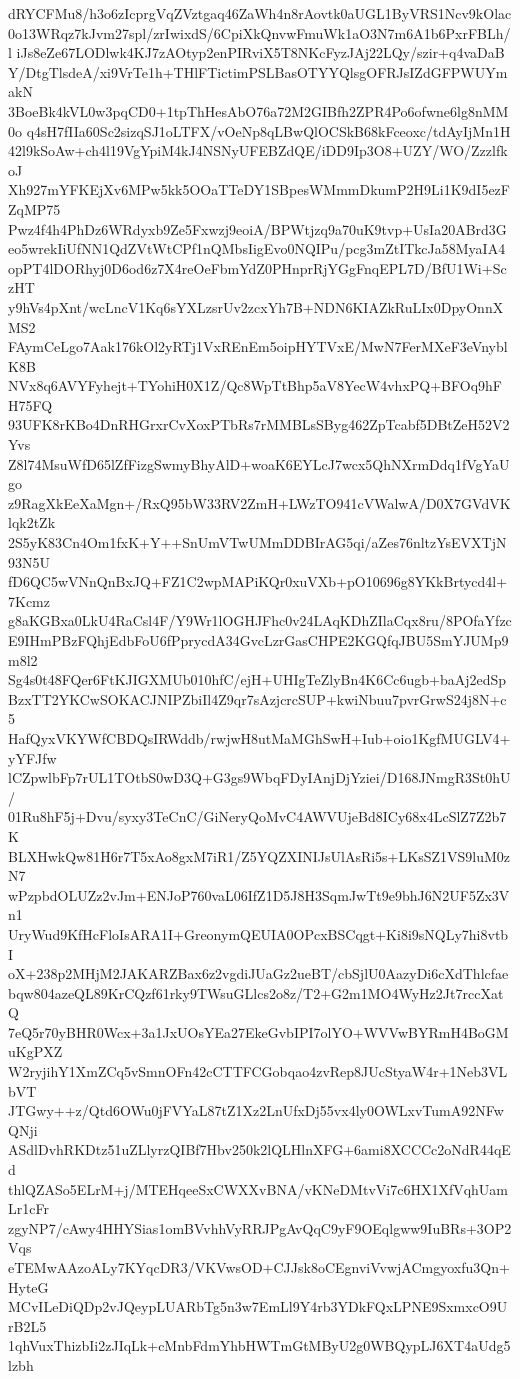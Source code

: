 dRYCFMu8/h3o6zIcprgVqZVztgaq46ZaWh4n8rAovtk0aUGL1ByVRS1Ncv9kOlac
0o13WRqz7kJvm27spl/zrIwixdS/6CpiXkQnvwFmuWk1aO3N7m6A1b6PxrFBLh/l
iJs8eZe67LODlwk4KJ7zAOtyp2enPIRviX5T8NKcFyzJAj22LQy/szir+q4vaDaB
Y/DtgTlsdeA/xi9VrTe1h+THlFTictimPSLBasOTYYQlsgOFRJsIZdGFPWUYmakN
3BoeBk4kVL0w3pqCD0+1tpThHesAbO76a72M2GIBfh2ZPR4Po6ofwne6lg8nMM0o
q4sH7fIIa60Sc2sizqSJ1oLTFX/vOeNp8qLBwQlOCSkB68kFceoxc/tdAyIjMn1H
42l9kSoAw+ch4l19VgYpiM4kJ4NSNyUFEBZdQE/iDD9Ip3O8+UZY/WO/ZzzlfkoJ
Xh927mYFKEjXv6MPw5kk5OOaTTeDY1SBpesWMmmDkumP2H9Li1K9dI5ezFZqMP75
Pwz4f4h4PhDz6WRdyxb9Ze5Fxwzj9eoiA/BPWtjzq9a70uK9tvp+UsIa20ABrd3G
eo5wrekIiUfNN1QdZVtWtCPf1nQMbsIigEvo0NQIPu/pcg3mZtITkcJa58MyaIA4
opPT4lDORhyj0D6od6z7X4reOeFbmYdZ0PHnprRjYGgFnqEPL7D/BfU1Wi+SczHT
y9hVs4pXnt/wcLncV1Kq6sYXLzsrUv2zcxYh7B+NDN6KIAZkRuLIx0DpyOnnXMS2
FAymCeLgo7Aak176kOl2yRTj1VxREnEm5oipHYTVxE/MwN7FerMXeF3eVnyblK8B
NVx8q6AVYFyhejt+TYohiH0X1Z/Qc8WpTtBhp5aV8YecW4vhxPQ+BFOq9hFH75FQ
93UFK8rKBo4DnRHGrxrCvXoxPTbRs7rMMBLsSByg462ZpTcabf5DBtZeH52V2Yvs
Z8l74MsuWfD65lZfFizgSwmyBhyAlD+woaK6EYLcJ7wcx5QhNXrmDdq1fVgYaUgo
z9RagXkEeXaMgn+/RxQ95bW33RV2ZmH+LWzTO941cVWalwA/D0X7GVdVKlqk2tZk
2S5yK83Cn4Om1fxK+Y++SnUmVTwUMmDDBIrAG5qi/aZes76nltzYsEVXTjN93N5U
fD6QC5wVNnQnBxJQ+FZ1C2wpMAPiKQr0xuVXb+pO10696g8YKkBrtycd4l+7Kcmz
g8aKGBxa0LkU4RaCsl4F/Y9Wr1lOGHJFhc0v24LAqKDhZIlaCqx8ru/8POfaYfzc
E9IHmPBzFQhjEdbFoU6fPprycdA34GvcLzrGasCHPE2KGQfqJBU5SmYJUMp9m8l2
Sg4s0t48FQer6FtKJIGXMUb010hfC/ejH+UHIgTeZlyBn4K6Cc6ugb+baAj2edSp
BzxTT2YKCwSOKACJNIPZbiIl4Z9qr7sAzjcrcSUP+kwiNbuu7pvrGrwS24j8N+c5
HafQyxVKYWfCBDQsIRWddb/rwjwH8utMaMGhSwH+Iub+oio1KgfMUGLV4+yYFJfw
lCZpwlbFp7rUL1TOtbS0wD3Q+G3gs9WbqFDyIAnjDjYziei/D168JNmgR3St0hU/
01Ru8hF5j+Dvu/syxy3TeCnC/GiNeryQoMvC4AWVUjeBd8ICy68x4LcSlZ7Z2b7K
BLXHwkQw81H6r7T5xAo8gxM7iR1/Z5YQZXINIJsUlAsRi5s+LKsSZ1VS9luM0zN7
wPzpbdOLUZz2vJm+ENJoP760vaL06IfZ1D5J8H3SqmJwTt9e9bhJ6N2UF5Zx3Vn1
UryWud9KfHcFloIsARA1I+GreonymQEUIA0OPcxBSCqgt+Ki8i9sNQLy7hi8vtbI
oX+238p2MHjM2JAKARZBax6z2vgdiJUaGz2ueBT/cbSjlU0AazyDi6cXdThlcfae
bqw804azeQL89KrCQzf61rky9TWsuGLlcs2o8z/T2+G2m1MO4WyHz2Jt7rccXatQ
7eQ5r70yBHR0Wcx+3a1JxUOsYEa27EkeGvbIPI7olYO+WVVwBYRmH4BoGMuKgPXZ
W2ryjihY1XmZCq5vSmnOFn42cCTTFCGobqao4zvRep8JUcStyaW4r+1Neb3VLbVT
JTGwy++z/Qtd6OWu0jFVYaL87tZ1Xz2LnUfxDj55vx4ly0OWLxvTumA92NFwQNji
ASdlDvhRKDtz51uZLlyrzQIBf7Hbv250k2lQLHlnXFG+6ami8XCCCc2oNdR44qEd
thlQZASo5ELrM+j/MTEHqeeSxCWXXvBNA/vKNeDMtvVi7c6HX1XfVqhUamLr1cFr
zgyNP7/cAwy4HHYSias1omBVvhhVyRRJPgAvQqC9yF9OEqlgww9IuBRs+3OP2Vqs
eTEMwAAzoALy7KYqcDR3/VKVwsOD+CJJsk8oCEgnviVvwjACmgyoxfu3Qn+HyteG
MCvILeDiQDp2vJQeypLUARbTg5n3w7EmLl9Y4rb3YDkFQxLPNE9SxmxcO9UrB2L5
1qhVuxThizbIi2zJIqLk+cMnbFdmYhbHWTmGtMByU2g0WBQypLJ6XT4aUdg5lzbh
